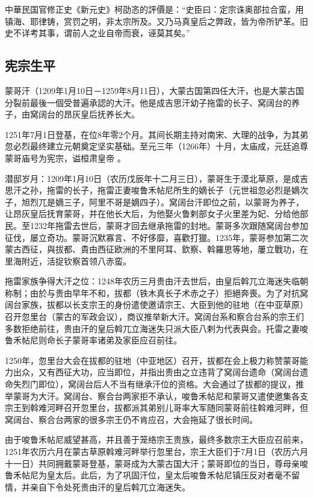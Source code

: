 中華民国官修正史《新元史》柯劭忞的評價是：“史臣曰：定宗诛奥部拉合蛮，用镇海、耶律铸，赏罚之明，非太宗所及。又乃马真皇后之弊政，皆为帝所铲革。旧史不详考其事，谓前人之业自帝而衰，诬莫其矣。” 


\subsection{宪宗生平}

蒙哥汗（1209年1月10日－1259年8月11日），大蒙古国第四任大汗，也是大蒙古国分裂前最後一個受普遍承認的大汗。他是成吉思汗幼子拖雷的长子、窝阔台的养子，由窝阔台的昂灰皇后抚养长大。

1251年7月1日登基，在位8年零2个月。其间长期主持对南宋、大理的战争，为其弟忽必烈最终建立元朝奠定坚实基础。至元三年（1266年）十月，太庙成，元廷追尊蒙哥庙号为宪宗，谥桓肃皇帝 。

潜邸岁月：1209年1月10日（农历戊辰年十二月三日），蒙哥生于漠北草原，是成吉思汗之孙，拖雷的长子，拖雷正妻唆鲁禾帖尼所生的嫡长子（元世祖忽必烈是嫡次子，旭烈兀是嫡三子，阿里不哥是嫡四子）。窝阔台汗即位之前，以蒙哥为养子，让昂灰皇后抚育蒙哥，并在他长大后，为他娶火鲁剌部女子火里差为妃、分给他部民。至1232年拖雷去世后，蒙哥才回去继承拖雷的封地。蒙哥多次跟随窝阔台参加征伐，屡立奇功。蒙哥沉默寡言、不好侈靡，喜歡打獵。1235年，蒙哥参加第二次蒙古西征，與拔都、貴由西征欧洲的不里阿耳、欽察、斡羅思等地，屢立戰功，在里海附近，活捉钦察首领八赤蛮。

拖雷家族争得大汗之位：1248年农历三月贵由汗去世后，由皇后斡兀立海迷失临朝称制；由於与贵由早年不和，拔都（铁木真长子术赤之子）拒絕奔喪。为了对抗窝阔台家族，拔都以长支宗王的身份遣使邀请宗王、大臣到他的驻地（在中亚草原）召开忽里台（蒙古的军政会议），商议推举新大汗。窝阔台系和察合台系的宗王们多数拒绝前往，贵由汗的皇后斡兀立海迷失只派大臣八剌为代表與会。托雷之妻唆鲁禾帖尼则命长子蒙哥率诸弟及家臣应召前往。

1250年，忽里台大会在拔都的驻地（中亚地区）召开，拔都在会上极力称赞蒙哥能力出众，又有西征大功，应当即位，并指出贵由之立违背了窝阔台遗命（窝阔台遗命失烈门即位），窝阔台后人不当有继承汗位的资格。大会通过了拔都的提议，推举蒙哥为大汗。窝阔台、察合台两家拒不承认，唆鲁禾帖尼和蒙哥又遣使邀集各支宗王到斡难河畔召开忽里台，拔都派其弟别儿哥率大军随同蒙哥前往斡难河畔，但窝阔台、察合台两家的很多宗王仍不肯应召，大会拖延了很长时间。

由于唆鲁禾帖尼威望甚高，并且善于笼络宗王贵族，最终多数宗王大臣应召前来，1251年农历六月在蒙古草原斡难河畔举行忽里台，宗王大臣们于7月1日（农历六月十一日）共同拥戴蒙哥登基，蒙哥成为大蒙古国大汗；蒙哥即位的当日，尊母亲唆鲁禾帖尼为皇太后。此后，为了巩固汗位，皇太后唆鲁禾帖尼镇压反对者毫不留情，并亲自下令处死贵由汗的皇后斡兀立海迷失。

